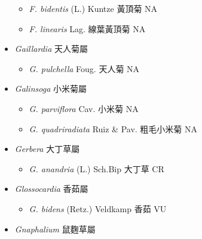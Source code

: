 \begin{itemize}
  \begin{itemize}
        \item[] \textit{F. bidentis} (L.) Kuntze  黃頂菊   NA
        \item[] \textit{F. linearis} Lag.  線葉黃頂菊   NA
  \end{itemize}
 \item[] \textit{Gaillardia} 天人菊屬
                                
  \begin{itemize}
        \item[] \textit{G. pulchella} Foug.  天人菊   NA
  \end{itemize}
 \item[] \textit{Galinsoga} 小米菊屬
                                
  \begin{itemize}
        \item[] \textit{G. parviflora} Cav.  小米菊   NA
        \item[] \textit{G. quadriradiata} Ruiz \& Pav.  粗毛小米菊   NA
  \end{itemize}
 \item[] \textit{Gerbera} 大丁草屬
                                
  \begin{itemize}
        \item[] \textit{G. anandria} (L.) Sch.Bip  大丁草   CR
  \end{itemize}
 \item[] \textit{Glossocardia} 香茹屬
                                
  \begin{itemize}
        \item[] \textit{G. bidens} (Retz.) Veldkamp  香茹   VU
  \end{itemize}
 \item[] \textit{Gnaphalium} 鼠麴草屬
                                

\end{itemize}

